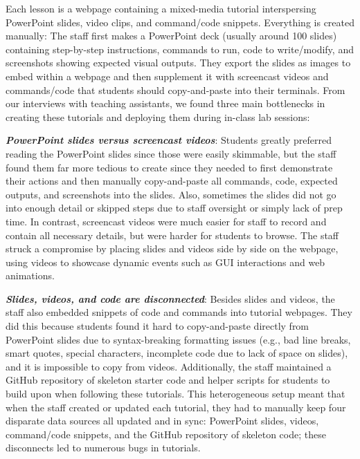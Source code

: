 Each lesson is a webpage containing a mixed-media tutorial interspersing
PowerPoint slides, video clips, and command/code snippets.
%
Everything is created manually: The staff first makes
a PowerPoint deck (usually around 100 slides) containing step-by-step
instructions, commands to run, code to write/modify, and screenshots
showing expected visual outputs. They export the slides as images to
embed within a webpage and then supplement it with screencast videos and
commands/code that students should copy-and-paste into their terminals.
%
%
From our interviews with teaching assistants, we found three main
bottlenecks in creating these tutorials and deploying them during
in-class lab sessions:

\textbf{\emph{PowerPoint slides versus screencast videos}}: Students
greatly preferred reading the PowerPoint slides since those were easily
skimmable, but the staff found them far more tedious to create since
they needed to first demonstrate their actions and then manually
copy-and-paste all commands, code, expected outputs, and screenshots
into the slides. Also, sometimes the slides did not go into enough
detail or skipped steps due to staff oversight or simply lack of prep time. In contrast, screencast videos were much easier for staff to record and
contain all necessary details, but were harder for students to browse.
The staff struck a compromise by placing slides and videos side by side
on the webpage, using videos to showcase
dynamic events such as GUI interactions and web animations.

\textbf{\emph{Slides, videos, and code are disconnected}}: Besides
slides and videos, the staff also embedded snippets of code and commands
into tutorial webpages. They did this because
students found it hard to copy-and-paste directly from PowerPoint slides
due to syntax-breaking formatting issues (e.g., bad line breaks, smart
quotes, special characters, incomplete code due to lack of space on
slides), and it is impossible to copy from videos. Additionally, the
staff maintained a GitHub repository of skeleton starter code and helper
scripts for students to build upon when following these tutorials. This
heterogeneous setup meant that when the staff created or updated each
tutorial, they had to manually keep four disparate data sources all
updated and in sync:
PowerPoint slides, videos, command/code snippets, and the GitHub
repository of skeleton code; these disconnects led to numerous bugs in
tutorials.

